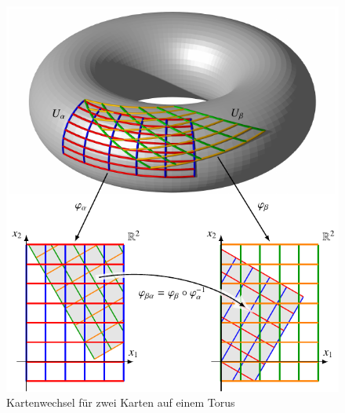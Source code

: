 %
%
\begin{figure}
\centering
\includegraphics{chapters/030-gruppen/images/karten.pdf}
\caption{Kartenwechsel für zwei Karten auf einem Torus
\label{buch:gruppen:gruppe:fig:kartenwechsel}}
\end{figure}
